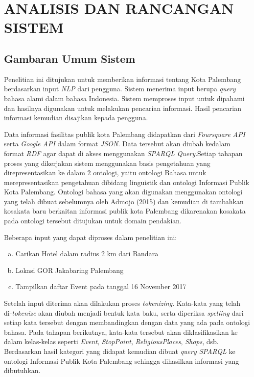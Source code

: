 
\chapter{ANALISIS DAN RANCANGAN SISTEM}
	\section{Gambaran Umum Sistem}
	Penelitian ini ditujukan untuk memberikan informasi tentang Kota Palembang berdasarkan input \emph{NLP} dari pengguna. Sistem menerima input berupa \emph{query} bahasa alami dalam bahasa Indonesia. Sistem memproses input untuk dipahami dan hasilnya digunakan untuk melakukan pencarian informasi. Hasil pencarian informasi kemudian disajikan kepada pengguna.

	Data informasi fasilitas publik kota Palembang didapatkan dari \emph{Foursquare API} serta \emph{Google API} dalam format \emph{JSON}. Data tersebut akan diubah kedalam format \emph{RDF} agar dapat di akses menggunakan \emph{SPARQL Query}.Setiap tahapan proses yang dikerjakan sistem menggunakan basis pengetahuan yang direpresentasikan ke dalam 2 ontologi, yaitu ontologi Bahasa untuk merepresentasikan pengetahuan dibidang linguistik dan ontologi Informasi Publik Kota Palembang. Ontologi bahasa yang akan digunakan menggunakan ontologi yang telah dibuat sebelumnya oleh Admojo (2015) dan kemudian di tambahkan kosakata baru berkaitan informasi publik kota Palembang dikarenakan kosakata pada ontologi tersebut ditujukan untuk domain pendakian.
	
	Beberapa input yang dapat diproses dalam penelitian ini:
	\begin{enumerate}[a.]
		\item Carikan Hotel dalam radius 2 km dari Bandara
		\item Lokasi GOR Jakabaring Palembang
		\item Tampilkan daftar Event pada tanggal 16 November 2017
	\end{enumerate}
	
	Setelah input diterima akan dilakukan proses \emph{tokenizing}. Kata-kata yang telah di-\emph{tokenize} akan diubah menjadi bentuk kata baku, serta diperiksa \emph{spelling} dari setiap kata tersebut dengan membandingkan dengan data yang ada pada ontologi bahasa. Pada tahapan berikutnya, kata-kata tersebut akan diklasifikasikan ke dalam kelas-kelas seperti \emph{Event}, \emph{StopPoint}, \emph{ReligiousPlaces}, \emph{Shops}, dsb. Berdasarkan hasil kategori yang didapat kemudian dibuat \emph{query SPARQL} ke ontologi Informasi Publik Kota Palembang sehingga dihasilkan informasi yang dibutuhkan.
	
